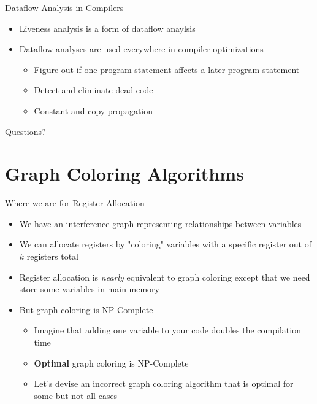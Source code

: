 \documentclass[aspectratio=169]{beamer}
\begin{document}
\begin{frame}{Dataflow Analysis in Compilers}
    \begin{itemize}
        \item Liveness analysis is a form of dataflow anaylsis
        \item Dataflow analyses are used everywhere in compiler optimizations
        \pause
        \begin{itemize}
            \item Figure out if one program statement affects a later program statement
            \item Detect and eliminate dead code
            \item Constant and copy propagation
        \end{itemize}
    \end{itemize}
\end{frame}

\begin{frame}{}
      \begin{center}
    {\color{sigma@mainblue} \LARGE Questions?}
  \end{center}
\end{frame}

\section{Graph Coloring Algorithms}
\frame{\sectionpage}

\begin{frame}{Where we are for Register Allocation}
    \begin{itemize}
        \item We have an interference graph representing relationships between variables
        \pause
        \item We can allocate registers by "coloring" variables with a specific register out of $k$ registers total
        \item Register allocation is \textit{nearly} equivalent to graph coloring except that we need store some variables in main memory
        \pause
        \item But graph coloring is NP-Complete
        \begin{itemize}
            \item Imagine that adding one variable to your code doubles the compilation time
            \pause
            \item \textbf{Optimal} graph coloring is NP-Complete
            \item Let's devise an incorrect graph coloring algorithm that is optimal for some but not all cases
        \end{itemize}
    \end{itemize}
\end{frame}
\end{document}
